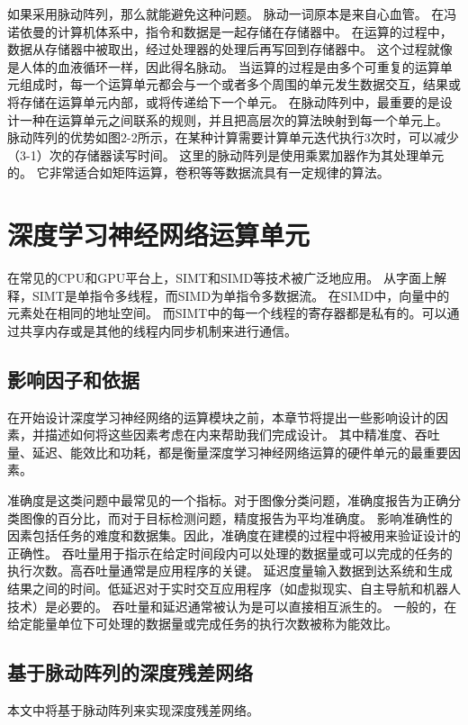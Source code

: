 如果采用脉动阵列，那么就能避免这种问题。
脉动一词原本是来自心血管。
在冯诺依曼的计算机体系中，指令和数据是一起存储在存储器中。
在运算的过程中，数据从存储器中被取出，经过处理器的处理后再写回到存储器中。
这个过程就像是人体的血液循环一样，因此得名脉动。
当运算的过程是由多个可重复的运算单元组成时，每一个运算单元都会与一个或者多个周围的单元发生数据交互，结果或将存储在运算单元内部，或将传递给下一个单元。
在脉动阵列中，最重要的是设计一种在运算单元之间联系的规则，并且把高层次的算法映射到每一个单元上。
脉动阵列的优势如图2-2所示，在某种计算需要计算单元迭代执行3次时，可以减少（3-1）次的存储器读写时间。
这里的脉动阵列是使用乘累加器作为其处理单元的。
它非常适合如矩阵运算，卷积等等数据流具有一定规律的算法。


\section{深度学习神经网络运算单元}

在常见的CPU和GPU平台上，SIMT和SIMD等技术被广泛地应用。
从字面上解释，SIMT是单指令多线程，而SIMD为单指令多数据流。
在SIMD中，向量中的元素处在相同的地址空间。
而SIMT中的每一个线程的寄存器都是私有的。可以通过共享内存或是其他的线程内同步机制来进行通信。


\subsection{影响因子和依据}
在开始设计深度学习神经网络的运算模块之前，本章节将提出一些影响设计的因素，并描述如何将这些因素考虑在内来帮助我们完成设计。
其中精准度、吞吐量、延迟、能效比和功耗，都是衡量深度学习神经网络运算的硬件单元的最重要因素。


准确度是这类问题中最常见的一个指标。对于图像分类问题，准确度报告为正确分类图像的百分比，而对于目标检测问题，精度报告为平均准确度。
影响准确性的因素包括任务的难度和数据集。因此，准确度在建模的过程中将被用来验证设计的正确性。
吞吐量用于指示在给定时间段内可以处理的数据量或可以完成的任务的执行次数。高吞吐量通常是应用程序的关键。
延迟度量输入数据到达系统和生成结果之间的时间。低延迟对于实时交互应用程序（如虚拟现实、自主导航和机器人技术）是必要的。
吞吐量和延迟通常被认为是可以直接相互派生的。
一般的，在给定能量单位下可处理的数据量或完成任务的执行次数被称为能效比。




\subsection{基于脉动阵列的深度残差网络}
本文中将基于脉动阵列来实现深度残差网络。

